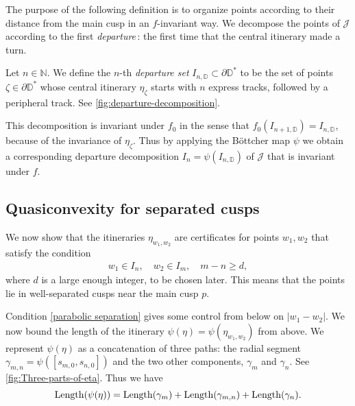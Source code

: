 The purpose of the following definition is to organize points according to their distance from the main cusp in an $f$-invariant way. We decompose the points of $\mathcal J$ according to the first \emph{departure}\,: the first time that the central itinerary made a turn.


\begin{definition}
Let $n \in \mathbb N$. We define the $n$-th \emph{departure set} $I_{n, \mathbb D} \subset \partial \mathbb D ^*$ to be the set of points $\zeta \in \partial \mathbb D^*$ whose central itinerary $\eta_{\zeta}$ starts with $n$ express tracks, followed by a peripheral track.
See \cref{fig:departure-decomposition}.
\end{definition}

This decomposition is invariant under $f_0$ in the sense that $f_0(I_{n+1, \mathbb D})=I_{n, \mathbb D}$, because of the invariance of $\eta _\zeta$.
Thus by applying the Böttcher map $\psi$ we obtain a corresponding departure decomposition $I_n = \psi(I_{n, \mathbb D})$ of $\mathcal J$ that is invariant under $f$.


\subsection{Quasiconvexity for separated cusps}
We now show that the itineraries $\eta_{w_1,w_2}$ are certificates for points $w_1,w_2$ that satisfy the condition 
\begin{align} \label{parabolic separation}
	w_1 \in I_n, \quad w_2 \in I_m, \quad m-n \geq d,
\end{align}
where $d$ is a large enough integer, to be chosen later. This means that the points lie in well-separated cusps near the main cusp $p$.

Condition \eqref{parabolic separation} gives some control from below on $|w_1-w_2|$. We now bound the length of the itinerary $\psi(\eta)=\psi(\eta_{w_1,w_2})$ from above.
We represent $\psi(\eta)$ as a concatenation of three paths: the radial segment $\gamma_{m,n}=\psi([s_{m,0},s_{n,0}])$ and the two other components, $\gamma _m$ and $\gamma_n$. See \cref{fig:Three-parts-of-eta}.
Thus we have
\begin{equation}
	\operatorname{Length}(\psi(\eta))=\operatorname{Length}(\gamma_m)+\operatorname{Length}(\gamma_{m,n})+\operatorname{Length}(\gamma_n).
\end{equation}

